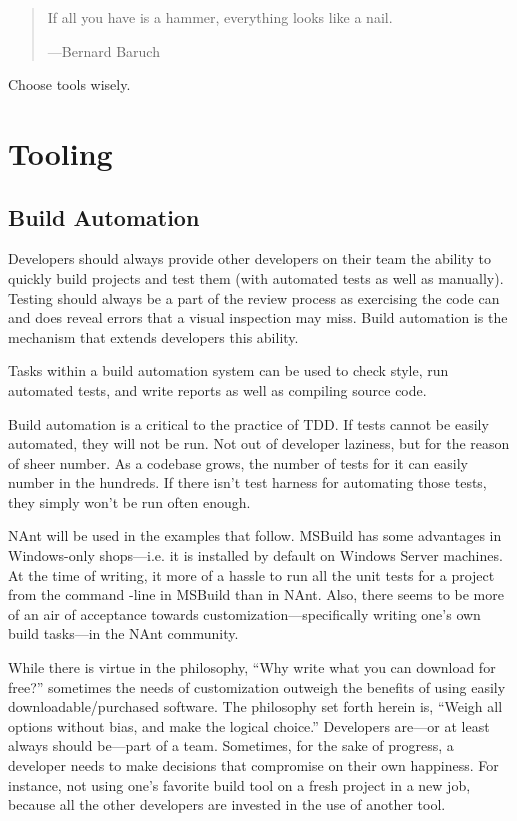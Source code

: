 \begin{quotation}
If all you have is a hammer, everything looks like a nail.

---Bernard Baruch
\end{quotation}

Choose tools wisely.

\section{Tooling}

\subsection{Build Automation}
Developers should always provide other developers on their team the ability to quickly build projects and test them (with automated tests as well as 
manually). Testing should always be a part of the review process as exercising the code can and does reveal errors that a visual inspection may 
miss. Build automation is the mechanism that extends developers this ability.

Tasks within a build automation system can be used to check style, run automated tests, and write reports as well as compiling source code.

Build automation is a critical to the practice of \gls{TDD}. If tests cannot be easily automated, they will not be run. Not out of developer laziness,
but for the reason of sheer number. As a codebase grows, the number of tests for it can easily number in the hundreds. If there isn't test harness for
automating those tests, they simply won't be run often enough.

\gls{NAnt} will be used in the examples that follow. MSBuild has some advantages in Windows-only shops---i.e. it is
installed by default on Windows Server machines. At the time of writing, it more of a hassle to run all the unit tests for a project from the command
-line in MSBuild than in NAnt. Also, there seems to be more of an air of acceptance towards customization---specifically writing one's own build 
tasks---in the NAnt community. 

While there is virtue in the philosophy, ``Why write what you can download for free?'' sometimes the needs of 
customization outweigh the benefits of using easily downloadable/purchased software. The philosophy set forth herein is, ``Weigh all options without bias, and make the
logical choice.'' Developers are---or at least always should be---part of a team. Sometimes, for the sake of progress, a developer needs to make
decisions that compromise on their own happiness. For instance, not using one's favorite build tool on a fresh project in a new job, because all the
other developers are invested in the use of another tool.

